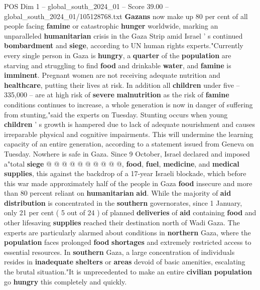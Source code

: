 \begin{textsample}{POS Dim 1 – global\_south\_2024\_01 – Score 39.00 – global\_south\_2024\_01/105128768.txt}  \label{ex:f1_pos_111}
\textbf{Gazans} now make up 80 per cent of all people facing \textbf{famine} or catastrophic \textbf{hunger} worldwide, marking an unparalleled \textbf{humanitarian} crisis in the Gaza Strip amid Israel ' s continued \textbf{bombardment} and \textbf{siege}, according to UN human rights experts."Currently every single person in Gaza is \textbf{hungry}, a \textbf{quarter} of the \textbf{population} are starving and struggling to find \textbf{food} and drinkable \textbf{water}, and \textbf{famine} is \textbf{imminent}.
Pregnant women are not receiving adequate nutrition and \textbf{healthcare}, putting their lives at risk.
In addition all \textbf{children} under five -- 335,000 -- are at high risk of \textbf{severe} \textbf{malnutrition} as the risk of \textbf{famine} conditions continues to increase, a whole generation is now in danger of suffering from stunting,"said the experts on Tuesday.
Stunting occurs when young \textbf{children} ' s growth is hampered due to lack of adequate nourishment and causes irreparable physical and cognitive impairments.
This will undermine the learning capacity of an entire generation, according to a statement issued from Geneva on Tuesday.
Nowhere is safe in Gaza.
Since 9 October, Israel declared and imposed a"total \textbf{siege} @ @ @ @ @ @ @ @ @ @, \textbf{food}, \textbf{fuel}, \textbf{medicine}, and \textbf{medical} \textbf{supplies}, this against the backdrop of a 17-year Israeli blockade, which before this war made approximately half of the people in Gaza \textbf{food} insecure and more than 80 percent reliant on \textbf{humanitarian} \textbf{aid}.
While the majority of \textbf{aid} \textbf{distribution} is concentrated in the \textbf{southern} governorates, since 1 January, only 21 per cent ( 5 out of 24 ) of planned \textbf{deliveries} of \textbf{aid} containing \textbf{food} and other lifesaving \textbf{supplies} reached their destination north of Wadi Gaza.
The experts are particularly alarmed about conditions in \textbf{northern} Gaza, where the \textbf{population} faces prolonged \textbf{food} \textbf{shortages} and extremely restricted access to essential resources.
In \textbf{southern} Gaza, a large concentration of individuals resides in \textbf{inadequate} \textbf{shelters} or \textbf{areas} devoid of basic amenities, escalating the brutal situation."It is unprecedented to make an entire \textbf{civilian} \textbf{population} go \textbf{hungry} this completely and quickly.

\end{textsample}
